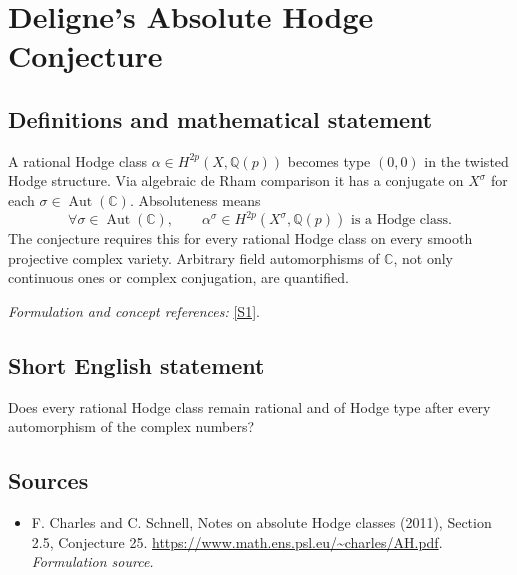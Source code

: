 \documentclass[11pt]{article}
\begin{document}
\section*{\texorpdfstring{Deligne's Absolute Hodge Conjecture}{Deligne's Absolute Hodge Conjecture}}\label{statement}
\subsection{Definitions and mathematical statement}
A rational Hodge class $\alpha\in H^{2p}(X,{\mathbb{Q}}(p))$ becomes type $(0,0)$ in the twisted Hodge structure. Via algebraic de Rham comparison it has a conjugate on $X^\sigma$ for each $\sigma\in\operatorname{Aut}({\mathbb{C}})$. Absoluteness means
\[
 \forall\sigma\in\operatorname{Aut}({\mathbb{C}}),\qquad
 \alpha^\sigma\in H^{2p}(X^\sigma,{\mathbb{Q}}(p))\text{ is a Hodge class}.
\]
The conjecture requires this for every rational Hodge class on every smooth projective complex variety. Arbitrary field automorphisms of ${\mathbb{C}}$, not only continuous ones or complex conjugation, are quantified.
\par\smallskip\textit{Formulation and concept references:} \href{https://www.math.ens.psl.eu/~charles/AH.pdf}{[S1]}.

\subsection{Short English statement}
Does every rational Hodge class remain rational and of Hodge type after every automorphism of the complex numbers?
\subsection{Sources}
\begin{itemize}
\item[S1]F. Charles and C. Schnell, Notes on absolute Hodge classes (2011), Section 2.5, Conjecture 25.
\url{https://www.math.ens.psl.eu/~charles/AH.pdf}.
\textit{Formulation source.}
\end{itemize}
\end{document}
